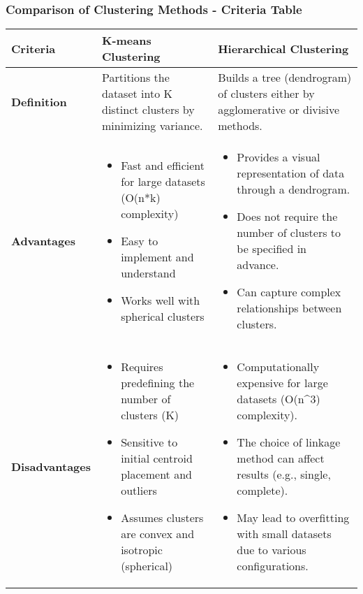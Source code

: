 \documentclass[aspectratio=169]{beamer}
\begin{document}
\begin{frame}[fragile]
    \frametitle{Comparison of Clustering Methods - Criteria Table}

    \begin{table}
        \centering
        \begin{tabular}{|l|l|l|}
            \hline
            \textbf{Criteria} & \textbf{K-means Clustering} & \textbf{Hierarchical Clustering} \\
            \hline
            \textbf{Definition} & Partitions the dataset into K distinct clusters by minimizing variance. & Builds a tree (dendrogram) of clusters either by agglomerative or divisive methods. \\
            \hline
            \textbf{Advantages} & 
            \begin{itemize}
                \item Fast and efficient for large datasets (O(n*k) complexity)
                \item Easy to implement and understand
                \item Works well with spherical clusters
            \end{itemize} & 
            \begin{itemize}
                \item Provides a visual representation of data through a dendrogram.
                \item Does not require the number of clusters to be specified in advance.
                \item Can capture complex relationships between clusters.
            \end{itemize} \\
            \hline
            \textbf{Disadvantages} & 
            \begin{itemize}
                \item Requires predefining the number of clusters (K)
                \item Sensitive to initial centroid placement and outliers
                \item Assumes clusters are convex and isotropic (spherical)
            \end{itemize} & 
            \begin{itemize}
                \item Computationally expensive for large datasets (O(n^3) complexity).
                \item The choice of linkage method can affect results (e.g., single, complete).
                \item May lead to overfitting with small datasets due to various configurations.
            \end{itemize} \\
            \hline
        \end{tabular}
    \end{table}
\end{frame}
\end{document}
